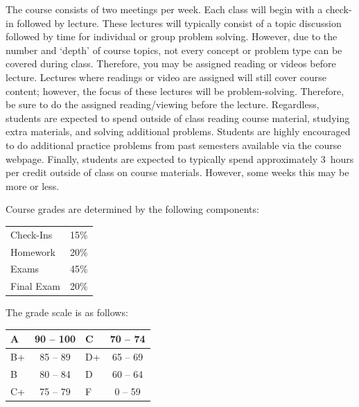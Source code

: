 \documentclass[11pt,letterpaper]{article}
\begin{document}
The course consists of two meetings per week. Each class will begin with a check-in followed by lecture. These lectures will typically consist of a topic discussion followed by time for individual or group problem solving. However, due to the number and `depth' of course topics, not every concept or problem type can be covered during class. Therefore, you may be assigned reading or videos before lecture. Lectures where readings or video are assigned will still cover course content; however, the focus of these lectures will be problem-solving. Therefore, be sure to do the assigned reading/viewing before the lecture. Regardless, students are expected to spend outside of class reading course material, studying extra materials, and solving additional problems. Students are highly encouraged to do additional practice problems from past semesters available via the course webpage. Finally, students are expected to typically spend approximately 3~hours per credit outside of class on course materials. However, some weeks this may be more or less. 
\sectionbreak








Course grades are determined by the following components: \par
	\begin{table}[!ht]
        \begin{tabular}{lr}
	Check-Ins & 15\% \\
        Homework & 20\% \\
        Exams & 45\% \\
        Final Exam & 20\% \\
        \end{tabular} 
        \end{table}
\sectionbreak




The grade scale is as follows: \par
        \begin{table}[!ht]
        \centering
        \begin{tabular}{|l||c|l||c|} \hline
        A & 90 -- 100 & C & 70 -- 74 \\ \hline
        B+ & 85 -- 89 & D+ & 65 -- 69 \\ \hline
        B & 80 -- 84 & D & 60 -- 64 \\ \hline
        C+ & 75 -- 79 & F & 0 -- 59 \\ \hline
        \end{tabular}
        \end{table} 
\sectionbreak
\end{document}
